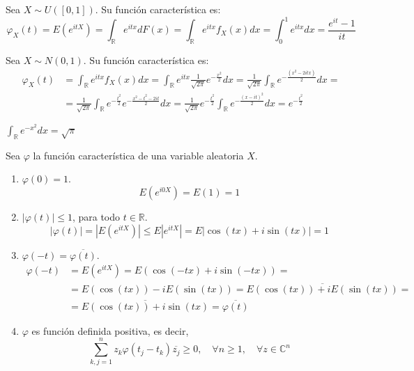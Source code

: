 \begin{example}
    Sea $X \sim U([0, 1])$.
    Su función característica es:
    $$\varphi_X(t) = E(e^{itX}) = \int_\mathbb{R} e^{itx}dF(x) = \int_\mathbb{R} e^{itx}f_X(x)dx = \int_0^1 e^{itx}dx = \frac{e^{it}-1}{it}$$
\end{example}

\begin{example}
    Sea $X \sim N(0, 1)$.
    Su función característica es:
    \begin{align*}
        \varphi_X(t) & = \int_\mathbb{R} e^{itx}f_X(x)dx = \int_\mathbb{R} e^{itx} \frac{1}{\sqrt{2\pi}}e^{-\frac{x^2}{2}}dx = \frac{1}{\sqrt{2\pi}} \int_\mathbb{R} e^{-\frac{(x^2-2itx)}{2}}dx =                     \\
                     & = \frac{1}{\sqrt{2\pi}} \int_\mathbb{R} e^{-\frac{t^2}{2}}e^{-\frac{x^2-t^2-2it}{2}}dx = \frac{1}{\sqrt{2\pi}}e^{-\frac{t^2}{2}} \int_\mathbb{R} e^{-\frac{(x-it)^2}{2}}dx = e^{-\frac{t^2}{2}}
    \end{align*}

    \begin{note}
        $\int_\mathbb{R} e^{-x^2}dx = \sqrt{\pi}$
    \end{note}
\end{example}

\begin{properties}
    Sea $\varphi$ la función característica de una variable aleatoria $X$.
    \begin{enumerate}
        \item $\varphi(0) = 1$.
              $$E(e^{i0X}) = E(1) = 1$$
        \item $|\varphi(t)| \leq 1$, para todo $t \in \mathbb{R}$.
              $$|\varphi(t)| = |E(e^{itX})| \leq E|e^{itX}| = E|\cos(tx) + i\sin(tx)| = 1$$
        \item $\varphi(-t) = \overline{\varphi(t)}$.
              \begin{align*}
                  \varphi(-t) & = E(e^{itX}) = E(\cos(-tx) + i\sin(-tx)) =                             \\
                              & = E(\cos(tx)) - iE(\sin(tx)) = \overline{E(\cos(tx)) + iE(\sin(tx))} = \\
                              & = \overline{E(\cos(tx)) + i\sin(tx)} = \overline{\varphi(t)}
              \end{align*}
        \item $\varphi$ es función definida positiva, es decir,
              $$\sum_{k,j=1}^n z_k\varphi(t_j-t_k)\overline{z_j} \geq 0, \quad \forall n \geq 1, \quad \forall z \in \mathbb{C}^n$$
    \end{enumerate}
\end{properties}

